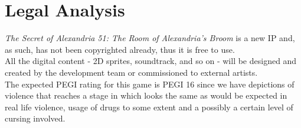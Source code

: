 \section{Legal Analysis}

\textit{The Secret of Alexandria 51: The Room of Alexandria’s Broom} is a new IP and, as such, has not been copyrighted already, thus it is free to use. \\
All the digital content - 2D sprites, soundtrack, and so on - will be designed and created by the development team or commissioned to external artists. \\

The expected PEGI rating for this game is PEGI 16 since we have depictions of violence that reaches a stage in which looks the same as would be expected in real life violence, usage of drugs to some extent and a possibly a certain level of cursing involved. \\
\pagebreak 